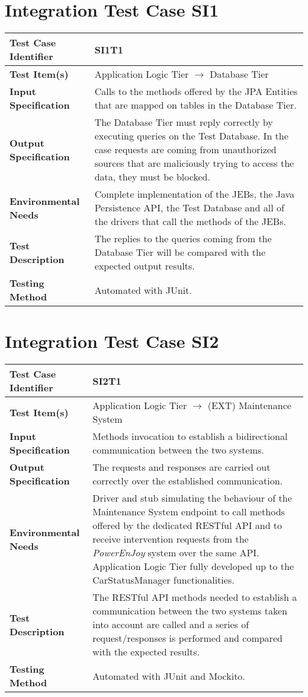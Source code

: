 \section{Integration Test Case SI1}

\begin{longtable}{p{} | p{}}
\hline
\textbf{Test Case Identifier} & SI1T1\\
\hline
\textbf{Test Item(s)} & Application Logic Tier $\rightarrow$ Database Tier \\
\hline
\textbf{Input Specification} & Calls to the methods offered by the JPA Entities that are mapped on tables in the Database Tier. \\
\hline
\textbf{Output Specification} & The Database Tier must reply correctly by executing queries on the Test Database. In the case requests are coming from unauthorized sources that are maliciously trying to access the data, they must be blocked. \\
\hline
\textbf{Environmental Needs} & Complete implementation of the JEBs, the Java Persistence API, the Test Database and all of the drivers that call the methods of the JEBs. \\
\hline
\textbf{Test Description} & The replies to the queries coming from the Database Tier will be compared with the expected output results. \\
\hline
\textbf{Testing Method} & Automated with JUnit. \\
\hline
\end{longtable}

\section{Integration Test Case SI2}

\begin{longtable}{p{} | p{}}
\hline
\textbf{Test Case Identifier} & SI2T1\\
\hline
\textbf{Test Item(s)} & Application Logic Tier $\rightarrow$ (EXT) Maintenance System \\
\hline
\textbf{Input Specification} & Methods invocation to establish a bidirectional communication between the two systems. \\
\hline
\textbf{Output Specification} & The requests and responses are carried out correctly over the established communication. \\
\hline
\textbf{Environmental Needs} & Driver and stub simulating the behaviour of the Maintenance System endpoint to call methods offered by the dedicated RESTful API and to receive intervention requests from the \emph{PowerEnJoy} system over the same API. Application Logic Tier fully developed up to the CarStatusManager functionalities. \\
\hline
\textbf{Test Description} & The RESTful API methods needed to establish a communication between the two systems taken into account are called and a series of request/responses is performed and compared with the expected results. \\
\hline
\textbf{Testing Method} & Automated with JUnit and Mockito. \\
\hline
\end{longtable}

